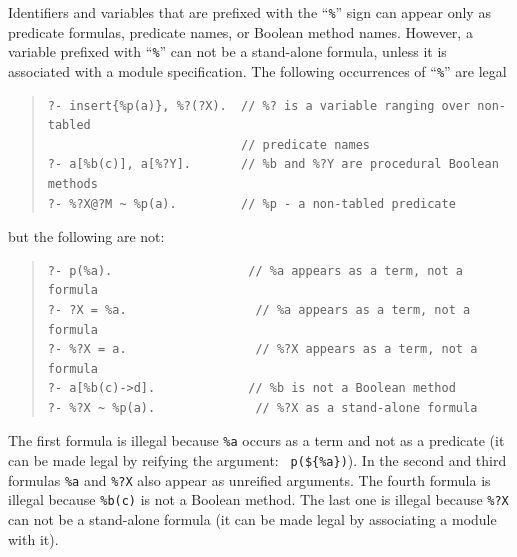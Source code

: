 \documentclass[11pt]{article}
\begin{document}
Identifiers and variables that are prefixed with the ``\verb|%|'' sign
can appear only as predicate formulas, predicate names, or Boolean
method names.  However, a variable prefixed with ``\verb|%|'' can not be
a stand-alone formula, unless it is associated with a module
specification. The following occurrences of ``\verb|%|'' are legal
\begin{quote}
\begin{verbatim}
?- insert{%p(a)}, %?(?X).  // %? is a variable ranging over non-tabled 
                           // predicate names
?- a[%b(c)], a[%?Y].       // %b and %?Y are procedural Boolean methods
?- %?X@?M ~ %p(a).         // %p - a non-tabled predicate

\end{verbatim}
\end{quote}
but the following are not:
\begin{quote}
\begin{verbatim}
?- p(%a).                   // %a appears as a term, not a formula
?- ?X = %a.                  // %a appears as a term, not a formula
?- %?X = a.                  // %?X appears as a term, not a formula
?- a[%b(c)->d].             // %b is not a Boolean method
?- %?X ~ %p(a).              // %?X as a stand-alone formula
\end{verbatim}
\end{quote}
The first formula is illegal because {\tt \%a} occurs as a term and not
as a predicate (it can be made legal by reifying the argument: {\tt
p(\$\{\%a\})}). In the second and third formulas {\tt \%a} and {\tt \%?X}
also appear as unreified arguments. The fourth formula is illegal
because {\tt \%b(c)} is not a Boolean method. The last one is illegal
because {\tt \%?X} can not be a stand-alone formula (it can be made legal
by associating a module with it).
\end{document}
